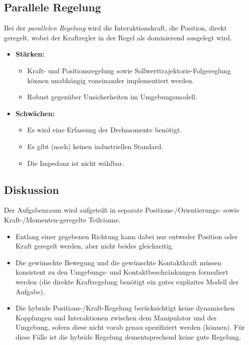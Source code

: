 		\subsection{Parallele Regelung}
			Bei der \emph{parallelen Regelung} wird die Interaktionskraft, \bzw die Position, direkt geregelt, wobei der Kraftregler in der Regel als dominierend ausgelegt wird.
			
			\begin{itemize}
				\item \textbf{Stärken:}
					\begin{itemize}
						\item Kraft- und Positionsregelung sowie Sollwerttrajektorie-Folgereglung können unabhängig voneinander implementiert werden.
						\item Robust gegenüber Unsicherheiten im Umgebungsmodell.
					\end{itemize}
				\item \textbf{Schwächen:}
					\begin{itemize}
						\item Es wird eine Erfassung der Drehmomente benötigt.
						\item Es gibt (noch) keinen industriellen Standard.
						\item Die Impedanz ist nicht wählbar.
					\end{itemize}
			\end{itemize}
		
		\subsection{Diskussion}
			\label{sec:controlhybriddiscussion}
		
			Der Aufgabenraum wird aufgeteilt in separate Positions-/Orientierungs- sowie Kraft-/Momenten-geregelte Teilräume.
			\begin{itemize}
				\item Entlang einer gegebenen Richtung kann dabei nur entweder Position oder Kraft geregelt werden, aber nicht beides gleichzeitig.
				\item Die gewünschte Bewegung und die gewünschte Kontaktkraft müssen konsistent zu den Umgebungs- und Kontaktbeschränkungen formuliert werden (\dh die direkte Kraftregelung benötigt ein gutes explizites Modell der Aufgabe).
				\item Die hybride Positions-/Kraft-Regelung berücksichtigt keine dynamischen Kopplungen und Interaktionen zwischen dem Manipulator und der Umgebung, sofern diese nicht vorab genau spezifiziert werden (können). Für diese Fälle ist die hybride Regelung dementsprechend keine gute Regelung.
			\end{itemize}

